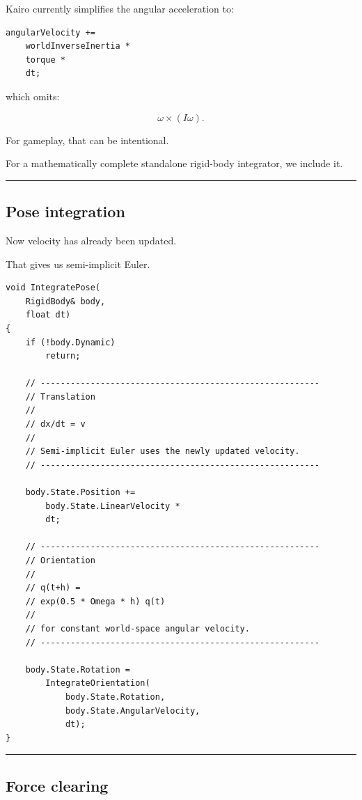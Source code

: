 Kairo currently simplifies the angular acceleration to:

\begin{verbatim}
angularVelocity +=
    worldInverseInertia *
    torque *
    dt;
\end{verbatim}

which omits:

\[
\omega\times(I\omega).
\]

For gameplay, that can be intentional.

For a mathematically complete standalone rigid-body integrator, we include it.

\begin{center}\rule{0.5\linewidth}{0.5pt}\end{center}

\subsection{Pose integration}\label{06-engine-ii-ch039-pose-integration}

Now velocity has already been updated.

That gives us semi-implicit Euler.

\begin{verbatim}
void IntegratePose(
    RigidBody& body,
    float dt)
{
    if (!body.Dynamic)
        return;

    // --------------------------------------------------------
    // Translation
    //
    // dx/dt = v
    //
    // Semi-implicit Euler uses the newly updated velocity.
    // --------------------------------------------------------

    body.State.Position +=
        body.State.LinearVelocity *
        dt;

    // --------------------------------------------------------
    // Orientation
    //
    // q(t+h) =
    // exp(0.5 * Omega * h) q(t)
    //
    // for constant world-space angular velocity.
    // --------------------------------------------------------

    body.State.Rotation =
        IntegrateOrientation(
            body.State.Rotation,
            body.State.AngularVelocity,
            dt);
}
\end{verbatim}

\begin{center}\rule{0.5\linewidth}{0.5pt}\end{center}

\subsection{Force clearing}\label{06-engine-ii-ch039-force-clearing}

